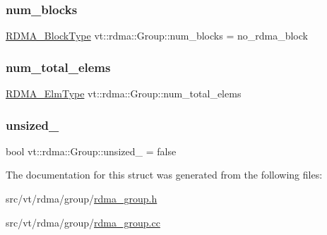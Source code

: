\subsubsection{\texorpdfstring{num\+\_\+blocks}{num\_blocks}}
{\footnotesize\ttfamily \hyperlink{namespacevt_ae54d2ca8f6bb4d65faf65118c82cd6f7}{R\+D\+M\+A\+\_\+\+Block\+Type} vt\+::rdma\+::\+Group\+::num\+\_\+blocks = no\+\_\+rdma\+\_\+block}

\mbox{\label{structvt_1_1rdma_1_1_group_ad2de94667177ad994c5b5b7b697d09ac}} 
\subsubsection{\texorpdfstring{num\+\_\+total\+\_\+elems}{num\_total\_elems}}
{\footnotesize\ttfamily \hyperlink{namespacevt_a2c2a902092b72056f70210c159f966f0}{R\+D\+M\+A\+\_\+\+Elm\+Type} vt\+::rdma\+::\+Group\+::num\+\_\+total\+\_\+elems}

\mbox{\label{structvt_1_1rdma_1_1_group_a670e96730f19cc80e7b55a391d96f0b4}} 
\subsubsection{\texorpdfstring{unsized\+\_\+}{unsized\_}}
{\footnotesize\ttfamily bool vt\+::rdma\+::\+Group\+::unsized\+\_\+ = false}



The documentation for this struct was generated from the following files\+:\begin{DoxyCompactItemize}
\item 
src/vt/rdma/group/\hyperlink{rdma__group_8h}{rdma\+\_\+group.\+h}\item 
src/vt/rdma/group/\hyperlink{rdma__group_8cc}{rdma\+\_\+group.\+cc}\end{DoxyCompactItemize}
